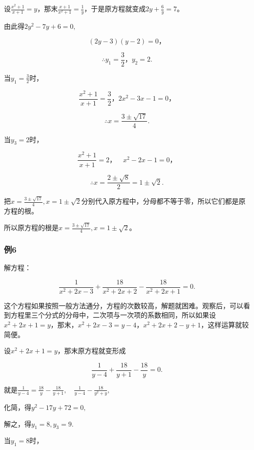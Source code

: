 设\(\frac{x^2 + 1}{x + 1} = y\)，那末\(\frac{x + 1}{x^2 + 1} = \frac{1}{y}\)，于是原方程就变成\(2y + \frac{6}{y} = 7\)。

由此得\(2y^{2} - 7y + 6 = 0,\)

\[
(2 y - 3) (y - 2) = 0\text{，}
\]

\[
\therefore y _ {1} = \frac{3}{2}\text{，} y _ {2} = 2.
\]

当\(y_{1} = \frac{3}{2}\)时，

\[
\frac{x ^ {2} + 1}{x + 1} = \frac{3}{2}\text{，} 2 x ^ {2} - 3 x - 1 = 0\text{，}
\]

\[
\therefore x = \frac{3 \pm \sqrt {17}}{4}.
\]

当\(y_{3}=2\)时，

\[
\frac{x ^ {2} + 1}{x + 1} = 2\text{，} \quad x ^ {2} - 2 x - 1 = 0\text{，}
\]

\[
\therefore x = \frac{2 \pm \sqrt {8}}{2} = 1 \pm \sqrt {2}.
\]

把\(x = \frac{3 \pm \sqrt{17}}{4}, x = 1 \pm \sqrt{2}\)分别代入原方程中，分母都不等于零，所以它们都是原方程的根。

所以原方程的根是\(x = \frac{3 \pm \sqrt{17}}{4}, x = 1 \pm \sqrt{2}\)。

\subsubsection{例6}

解方程：

\[
\frac{1}{x ^ {2} + 2 x - 3} + \frac{18}{x ^ {2} + 2 x + 2} - \frac{18}{x ^ {2} + 2 x + 1} = 0.
\]


这个方程如果按照一般方法通分，方程的次数较高，解题就困难。观察后，可以看到方程里三个分式的分母中，二次项与一次项的系数相同，所以如果设\(x^{2} + 2x + 1 = y\)，那末，\(x^{2} + 2x - 3 = y - 4\)，\(x^{2} + 2x + 2 - y + 1\)，这样运算就较简便。

 设\(x^{2} + 2x + 1 = y\)，那末原方程就变形成

\[
\frac{1}{y - 4} + \frac{18}{y + 1} - \frac{18}{y} = 0.
\]

就是\(\frac{1}{y - 4} = \frac{18}{y} -\frac{18}{y + 1},\quad \frac{1}{y - 4} -\frac{18}{y^2 + y},\)

化简，得\(y^{2} - 17y + 72 = 0,\)

解之，得\(y_{1} = 8, y_{3} = 9.\)

当\(y_{1} = 8\)时，

